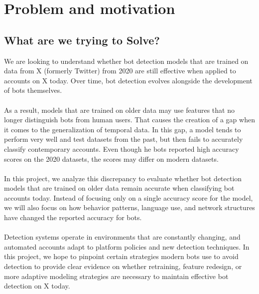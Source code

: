 \maketitle

\section{Problem and motivation}

\subsection{What are we trying to Solve?}
        We are looking to understand whether bot detection models that are trained on data from X (formerly Twitter) from 2020 are still effective when applied to accounts on X today. Over time, bot detection evolves alongside the development of bots themselves.
        \\\\
        As a result, models that are trained on older data may use features that no longer distinguish bots from human users. That causes the creation of a gap when it comes to the generalization of temporal data. In this gap, a model tends to perform very well and test datasets from the past, but then fails to accurately classify contemporary accounts. Even though he bots reported high accuracy scores on the 2020 datasets, the scores may differ on modern datasets. 
        \\\\
        In this project, we analyze this discrepancy to evaluate whether bot detection models that are trained on older data remain accurate when classifying bot accounts today. Instead of focusing only on a single accuracy score for the model, we will also focus on how behavior patterns, language use, and network structures have changed the reported accuracy for bots. 
        \\\\
        Detection systems operate in environments that are constantly changing, and automated accounts adapt to platform policies and new detection techniques. In this project, we hope to pinpoint certain strategies modern bots use to avoid detection to provide clear evidence on whether retraining, feature redesign, or more adaptive modeling strategies are necessary to maintain effective bot detection on X today.

